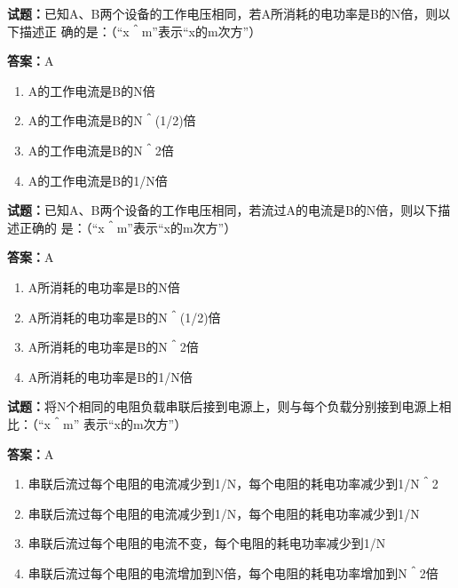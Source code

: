 \documentclass{ctexbook}
\begin{document}
\textbf{试题：}已知A、B两个设备的工作电压相同，若A所消耗的电功率是B的N倍，则以下描述正
确的是：（“x＾m”表示“x的m次方”） 

\textbf{答案：}A 

\begin{enumerate}[leftmargin=3em]
  \item A的工作电流是B的N倍 


  \item A的工作电流是B的N＾(1/2)倍 

  \item A的工作电流是B的N＾2倍 

  \item A的工作电流是B的1/N倍 

\end{enumerate}





\vspace{1em}

\textbf{试题：}已知A、B两个设备的工作电压相同，若流过A的电流是B的N倍，则以下描述正确的
是：（“x＾m”表示“x的m次方”） 

\textbf{答案：}A 

\begin{enumerate}[leftmargin=3em]
  \item A所消耗的电功率是B的N倍 

  \item A所消耗的电功率是B的N＾(1/2)倍 

  \item A所消耗的电功率是B的N＾2倍 

  \item A所消耗的电功率是B的1/N倍 

\end{enumerate}





\vspace{1em}

\textbf{试题：}将N个相同的电阻负载串联后接到电源上，则与每个负载分别接到电源上相比：（“x＾m”
表示“x的m次方”） 

\textbf{答案：}A 

\begin{enumerate}[leftmargin=3em]
  \item 串联后流过每个电阻的电流减少到1/N，每个电阻的耗电功率减少到1/N＾2 

  \item 串联后流过每个电阻的电流减少到1/N，每个电阻的耗电功率减少到1/N 

  \item 串联后流过每个电阻的电流不变，每个电阻的耗电功率减少到1/N 

  \item 串联后流过每个电阻的电流增加到N倍，每个电阻的耗电功率增加到N＾2倍 

\end{enumerate}
\end{document}
